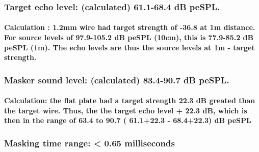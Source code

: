 \documentclass[11pt]{article}
\begin{document}
\hypertarget{target-echo-level-calculated-61.1-68.4-db-pespl.}{%
\subsubsection{Target echo level: (calculated) 61.1-68.4 dB
peSPL.}\label{target-echo-level-calculated-61.1-68.4-db-pespl.}}

\hypertarget{calculation-1.2mm-wire-had-target-strength-of--36.8-at-1m-distance.-for-source-levels-of-97.9-105.2-db-pespl-10cm-this-is-77.9-85.2-db-pespl-1m.-the-echo-levels-are-thus-the-source-levels-at-1m---target-strength.}{%
\paragraph{Calculation : 1.2mm wire had target strength of -36.8 at 1m
distance. For source levels of 97.9-105.2 dB peSPL (10cm), this is
77.9-85.2 dB peSPL (1m). The echo levels are thus the source levels at
1m - target
strength.}\label{calculation-1.2mm-wire-had-target-strength-of--36.8-at-1m-distance.-for-source-levels-of-97.9-105.2-db-pespl-10cm-this-is-77.9-85.2-db-pespl-1m.-the-echo-levels-are-thus-the-source-levels-at-1m---target-strength.}}

\hypertarget{masker-sound-level-calculated-83.4-90.7-db-pespl.}{%
\subsubsection{Masker sound level: (calculated) 83.4-90.7 dB
peSPL.}\label{masker-sound-level-calculated-83.4-90.7-db-pespl.}}

\hypertarget{calculation-the-flat-plate-had-a-target-strength-22.3-db-greated-than-the-target-wire.-thus-the-the-target-echo-level-22.3-db-which-is-then-in-the-range-of-63.4-to-90.7-61.122.3---68.422.3-db-pespl}{%
\paragraph{Calculation: the flat plate had a target strength 22.3 dB
greated than the target wire. Thus, the the target echo level + 22.3 dB,
which is then in the range of 63.4 to 90.7 ( 61.1+22.3 - 68.4+22.3) dB
peSPL}\label{calculation-the-flat-plate-had-a-target-strength-22.3-db-greated-than-the-target-wire.-thus-the-the-target-echo-level-22.3-db-which-is-then-in-the-range-of-63.4-to-90.7-61.122.3---68.422.3-db-pespl}}

\hypertarget{masking-time-range-0.65-milliseconds}{%
\subsubsection{Masking time range: \textless{} 0.65
milliseconds}\label{masking-time-range-0.65-milliseconds}}
\end{document}
